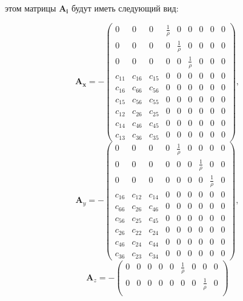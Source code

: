 \documentclass[thesis.tex]{subfiles}
\begin{document}
этом матрицы $\mathbf{A_i}$ будут иметь следующий вид:
\begin{small}
\begin{equation}
    \label{анизотропная_матрица_x}
    \mathbf{A_x} = -\begin{pmatrix}
    0 & 0 & 0 & \frac 1 \rho & 0 & 0 & 0 & 0 & 0 \\
    0 & 0 & 0 & 0 & \frac 1 \rho & 0 & 0 & 0 & 0 \\
    0 & 0 & 0 & 0 & 0 & \frac 1 \rho & 0 & 0 & 0 \\
    c_{11} & c_{16} & c_{15} & 0 & 0 & 0 & 0 & 0 & 0 \\
    c_{16} & c_{66} & c_{56} & 0 & 0 & 0 & 0 & 0 & 0 \\
    c_{15} & c_{56} & c_{55} & 0 & 0 & 0 & 0 & 0 & 0 \\
    c_{12} & c_{26} & c_{25} & 0 & 0 & 0 & 0 & 0 & 0 \\
    c_{14} & c_{46} & c_{45} & 0 & 0 & 0 & 0 & 0 & 0 \\
    c_{13} & c_{36} & c_{35} & 0 & 0 & 0 & 0 & 0 & 0
    \end{pmatrix},
\end{equation}
\begin{equation}
    \label{анизотропная_матрица_y}
    \mathbf{A}_y = -\begin{pmatrix}
    0 & 0 & 0 & 0 & \frac 1 \rho & 0 & 0 & 0 & 0 \\
    0 & 0 & 0 & 0 & 0 & 0 & \frac 1 \rho & 0 & 0 \\
    0 & 0 & 0 & 0 & 0 & 0 & 0 & \frac 1 \rho & 0 \\
    c_{16} & c_{12} & c_{14} & 0 & 0 & 0 & 0 & 0 & 0 \\
    c_{66} & c_{26} & c_{46} & 0 & 0 & 0 & 0 & 0 & 0 \\
    c_{56} & c_{25} & c_{45} & 0 & 0 & 0 & 0 & 0 & 0 \\
    c_{26} & c_{22} & c_{24} & 0 & 0 & 0 & 0 & 0 & 0 \\
    c_{46} & c_{24} & c_{44} & 0 & 0 & 0 & 0 & 0 & 0 \\
    c_{36} & c_{23} & c_{34} & 0 & 0 & 0 & 0 & 0 & 0
    \end{pmatrix},
\end{equation}
\begin{equation}
    \label{анизотропная_матрица_z}
    \mathbf{A}_z = -\begin{pmatrix}
    0 & 0 & 0 & 0 & 0 & \frac 1 \rho & 0 & 0 & 0 \\
    0 & 0 & 0 & 0 & 0 & 0 & 0 & \frac 1 \rho & 0 \\

\end{pmatrix}
\end{equation}
\end{small}
\end{document}
